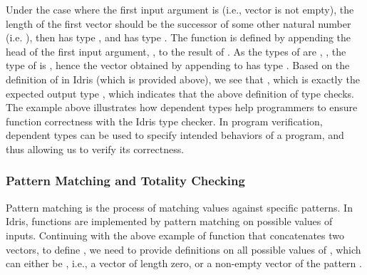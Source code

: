 Under the case where the first input argument is  (i.e., vector is not empty), the length of the first vector  should be the successor of some other natural number  (i.e. ), then  has type , and  has type . The  function is defined by appending the head of the first input argument, , to the result of . As the types of  are , , the type of  is , hence the vector obtained by appending  to  has type . Based on the definition of  in Idris (which is provided above), we see that , which is exactly the expected output type , which indicates that the above definition of  type checks. 
\\

The  example above illustrates how dependent types help programmers to ensure function correctness with the Idris type checker. In program verification, dependent types can be used to specify intended behaviors of a program, and thus allowing us to verify its correctness. 


\subsubsection*{Pattern Matching and Totality Checking}
Pattern matching is the process of matching values against specific patterns. In Idris, functions are implemented by pattern matching on possible values of inputs. Continuing with the above example of  function that concatenates two vectors, to define , we need to provide definitions on all possible values of , which can either be , i.e., a vector of length zero, or a non-empty vector of the pattern . 
\\

